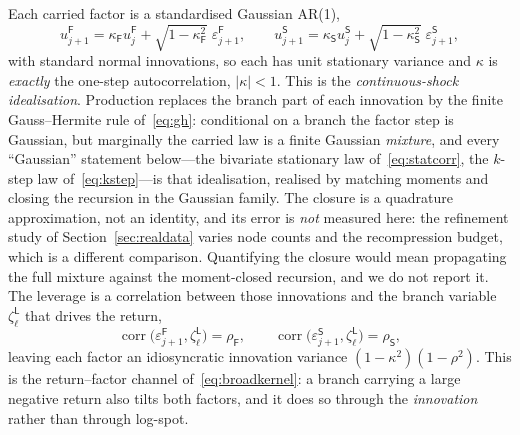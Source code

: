 \documentclass[11pt]{article}
\providecommand{\1}{\mathbf 1}
\begin{document}
Each carried factor is a standardised Gaussian \textup{AR(1)},
\begin{equation}
u^{\mathsf F}_{j+1}=\kappa_{\mathsf F}u^{\mathsf F}_j+\sqrt{1-\kappa_{\mathsf F}^{2}}\;
  \varepsilon^{\mathsf F}_{j+1},
\qquad
u^{\mathsf S}_{j+1}=\kappa_{\mathsf S}u^{\mathsf S}_j+\sqrt{1-\kappa_{\mathsf S}^{2}}\;
  \varepsilon^{\mathsf S}_{j+1},
\label{eq:ar1}
\end{equation}
with standard normal innovations, so each has unit stationary variance and $\kappa$ is
\emph{exactly} the one-step autocorrelation, $|\kappa|<1$. This is the \emph{continuous-shock
idealisation}. Production replaces the branch part of each innovation by the finite
Gauss--Hermite rule of~\eqref{eq:gh}: conditional on a branch the factor step is Gaussian, but
marginally the carried law is a finite Gaussian \emph{mixture}, and every ``Gaussian'' statement
below---the bivariate stationary law of~\eqref{eq:statcorr}, the $k$-step law
of~\eqref{eq:kstep}---is that idealisation, realised by matching moments and closing the recursion
in the Gaussian family. The closure is a quadrature approximation, not an identity, and its error is
\emph{not} measured here: the refinement study of Section~\ref{sec:realdata} varies node counts and
the recompression budget, which is a different comparison. Quantifying the closure would mean
propagating the full mixture against the moment-closed recursion, and we do not report it. The leverage is a correlation between
those innovations and the branch variable $\zeta^{\mathsf L}_\ell$ that drives the return,
\begin{equation}
\operatorname{corr}\bigl(\varepsilon^{\mathsf F}_{j+1},\zeta^{\mathsf L}_\ell\bigr)=\rho_{\mathsf F},
\qquad
\operatorname{corr}\bigl(\varepsilon^{\mathsf S}_{j+1},\zeta^{\mathsf L}_\ell\bigr)=\rho_{\mathsf S},
\label{eq:lev}
\end{equation}
leaving each factor an idiosyncratic innovation variance $(1-\kappa^2)(1-\rho^2)$. This is the
return--factor channel of~\eqref{eq:broadkernel}: a branch carrying a large negative return also
tilts both factors, and it does so through the \emph{innovation} rather than through log-spot.
\end{document}
